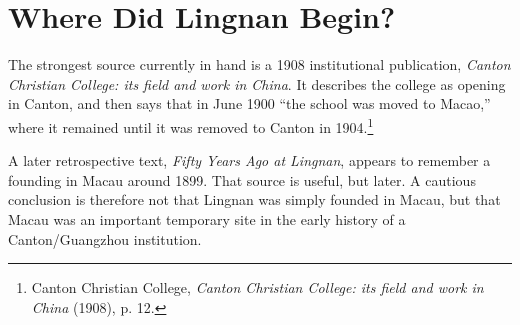 \section*{Where Did Lingnan Begin?}

The strongest source currently in hand is a 1908 institutional publication,
\emph{Canton Christian College: its field and work in China}. It describes the
college as opening in Canton, and then says that in June 1900 ``the school was
moved to Macao,'' where it remained until it was removed to Canton in 1904.\footnote{
Canton Christian College, \emph{Canton Christian College: its field and work in
China} (1908), p. 12.}

A later retrospective text, \emph{Fifty Years Ago at Lingnan}, appears to
remember a founding in Macau around 1899. That source is useful, but later. A
cautious conclusion is therefore not that Lingnan was simply founded in Macau,
but that Macau was an important temporary site in the early history of a
Canton/Guangzhou institution.

